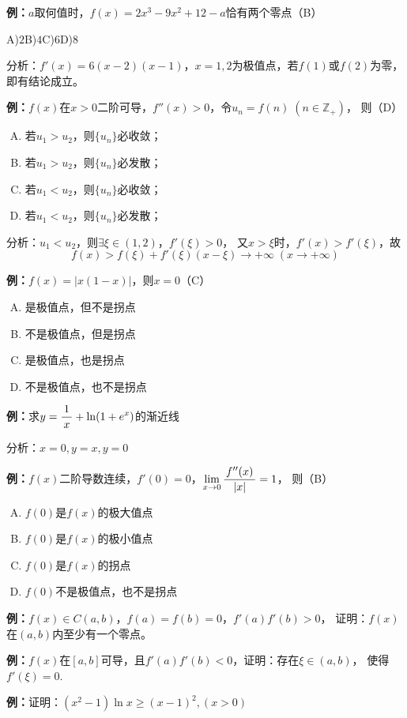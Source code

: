 {\bf 例：}$a$取何值时，$f(x)=2x^3-9x^2+12-a$恰有两个零点（B）

A)$2$\quad B)$4$\quad C)$6$\quad D)$8$

分析：$f'(x)=6(x-2)(x-1)$，$x=1,2$为极值点，若$f(1)$或$f(2)$为零，即有结论成立。

{\bf 例：}$f(x)$在$x>0$二阶可导，$f''(x)>0$，令$u_n=f(n)\;(n\in\mathbb{Z}_+)$，
则（D）
\begin{enumerate}[A)]
  \setlength{\itemindent}{1cm}
  \item 若$u_1>u_2$，则$\{u_n\}$必收敛；
  \item 若$u_1>u_2$，则$\{u_n\}$必发散；
  \item 若$u_1<u_2$，则$\{u_n\}$必收敛；
  \item 若$u_1<u_2$，则$\{u_n\}$必发散；
\end{enumerate}

分析：$u_1<u_2$，则$\exists\xi\in(1,2)$，$f'(\xi)>0$，
又$x>\xi$时，$f'(x)>f'(\xi)$，故
$$f(x)>f(\xi)+f'(\xi)(x-\xi)\to+\infty\;(x\to+\infty)$$

{\bf 例：}$f(x)=|x(1-x)|$，则$x=0$（C）
\begin{enumerate}[A)]
  \setlength{\itemindent}{1cm}
  \item 是极值点，但不是拐点
  \item 不是极值点，但是拐点
  \item 是极值点，也是拐点
  \item 不是极值点，也不是拐点
\end{enumerate}

{\bf 例：}求$y=\displaystyle\frac{\,{1}\,}{\,{x}\,}+\ln(1+e^x)$的渐近线

分析：$x=0,y=x,y=0$

{\bf 例：}$f(x)$二阶导数连续，$f'(0)=0$，$\lim\limits_{x\to{0}}\displaystyle\frac{\,{f''(x)}\,}{\,{|x|}\,}=1$，
则（B）
\begin{enumerate}[A)]
  \setlength{\itemindent}{1cm}
  \item $f(0)$是$f(x)$的极大值点
  \item $f(0)$是$f(x)$的极小值点
  \item $f(0)$是$f(x)$的拐点
  \item $f(0)$不是极值点，也不是拐点
\end{enumerate}

{\bf 例：}$f(x)\in C(a,b)$，$f(a)=f(b)=0$，$f'(a)f'(b)>0$，
证明：$f(x)$在$(a,b)$内至少有一个零点。

{\bf 例：}$f(x)$在$[a,b]$可导，且$f'(a)f'(b)<0$，证明：存在$\xi\in(a,b)$，
使得$f'(\xi)=0$.

{\bf 例：}证明：$(x^2-1)\ln x\geq(x-1)^2,(x>0)$

